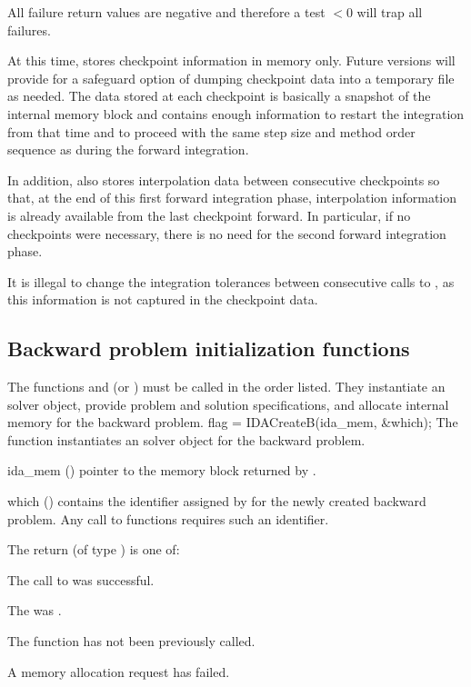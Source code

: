 {
  All failure return values are negative and therefore a test $< 0$
  will trap all  failures.

  At this time,  stores checkpoint information in memory
  only. Future versions will provide for a safeguard option of dumping checkpoint
  data into a temporary file as needed. The data stored at each checkpoint is basically
  a snapshot of the {\idas} internal memory block and contains enough information
  to restart the integration from that time and to proceed with the same step size and
  method order sequence as during the forward integration.
  
  In addition,  also stores interpolation data between consecutive checkpoints
  so that, at the end of this first forward integration phase, interpolation information
  is already available from the last checkpoint forward. In particular,
  if no checkpoints were necessary, there is no need for the second forward integration phase.

  {\warn}It is illegal to change the integration tolerances between consecutive calls
  to , as this information is not captured in the checkpoint data.
}  

\subsection{Backward problem initialization functions}
\label{sss:idainitb}

The functions  and  (or ) must be 
called in the order listed. They instantiate an {\idas} solver object, provide problem 
and solution specifications, and allocate internal memory for the backward problem.
{
  flag = IDACreateB(ida\_mem, \&which);
}
{
  The function  instantiates an {\idas} solver object for the
  backward problem.
}
{
  \begin{args}
  \item[ida\_mem] ()
    pointer to the {\idas} memory block returned by .
  \item[which] ()
    contains the identifier assigned by {\idas} for the newly created backward 
    problem. Any call to  functions requires such an identifier.
  \end{args}
}
{
   The return  (of type ) is one of:
   \begin{args}
   \item[\Id{IDA\_SUCCESS}]
     The call to  was successful.
   \item[\Id{IDA\_MEM\_NULL}]
     The  was .
   \item[\Id{IDA\_NO\_ADJ}]
     The function  has not been previously called.
   \item[\Id{IDA\_MEM\_FAIL}]
     A memory allocation request has failed.
   \end{args}
}
{}

